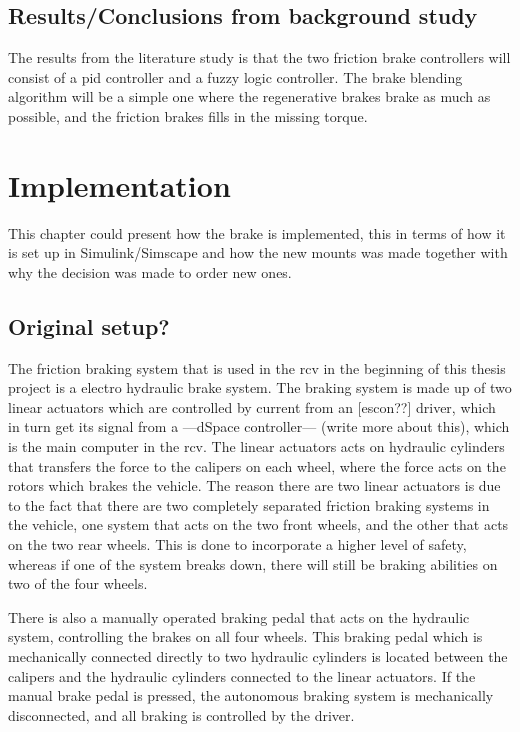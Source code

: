 \documentclass[a4paper,11pt]{kth-mag}
\begin{document}
\section{Results/Conclusions from background study}
The results from the literature study is that the two friction brake controllers will consist of a \gls{pid} controller and a fuzzy logic controller. 
The brake blending algorithm will be a simple one where the regenerative brakes brake as much as possible, and the friction brakes fills in the missing torque. 



\chapter{Implementation}

This chapter could present how the brake is implemented, this in terms of how it is set up in Simulink/Simscape and how the new mounts was made together with why the decision was made to order new ones.

\section{Original setup?}
The friction braking system that is used in the \gls{rcv} in the beginning of this thesis project is a electro hydraulic brake system. The braking system is made up of two linear actuators which are controlled by current from an [escon??] driver, which in turn get its signal from a ---dSpace controller--- (write more about this), which is the main computer in the \gls{rcv}. The linear actuators acts on hydraulic cylinders that transfers the force to the calipers on each wheel, where the force acts on the rotors which brakes the vehicle. The reason there are two linear actuators is due to the fact that there are two completely separated friction braking systems in the vehicle, one system that acts on the two front wheels, and the other that acts on the two rear wheels. This is done to incorporate a higher level of safety, whereas if one of the system breaks down, there will still be braking abilities on two of the four wheels. \newline

There is also a manually operated braking pedal that acts on the hydraulic system, controlling the brakes on all four wheels. This braking pedal which is mechanically connected directly to two hydraulic cylinders is located between the calipers and the hydraulic cylinders connected to the linear actuators. If the manual brake pedal is pressed, the autonomous braking system is mechanically disconnected, and all braking is controlled by the driver. \newline
\end{document}
